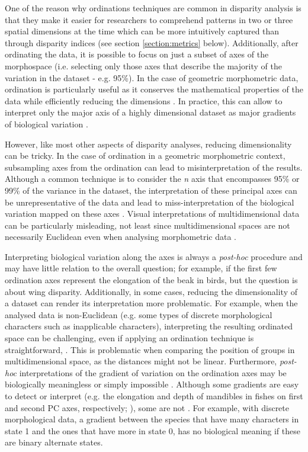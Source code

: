 \documentclass[12pt,letterpaper]{article}
\begin{document}
One of the reason why ordinations techniques are common in disparity analysis is that they make it easier for researchers to comprehend patterns in two or three spatial dimensions at the time which can be more intuitively captured than through disparity indices (see section \ref{section:metrics} below).
Additionally, after ordinating the data, it is possible to focus on just a subset of axes of the morphospace (i.e. selecting only those axes that describe the majority of the variation in the dataset - e.g. 95\%).
In the case of geometric morphometric data, ordination is particularly useful as it conserves the mathematical properties of the data while efficiently reducing the dimensions \citep{Legendre2012-va,dryden2016statistical}.
In practice, this can allow to interpret only the major axis of a highly dimensional dataset as major gradients of biological variation \citep[e.g. the elongation and flattening of birds beaks;][]{Cooney2017-ly}.

However, like most other aspects of disparity analyses, reducing dimensionality can be tricky.
In the case of ordination in a geometric morphometric context, subsampling axes from the ordination can lead to misinterpretation of the results. 
Although a common technique is to consider the \textit{n} axis that encompasses 95\% or 99\% of the variance in the dataset, the interpretation of these principal axes can be unrepresentative of the data and lead to miss-interpretation of the biological variation mapped on these axes \citep{Bookstein2015-yy, Bookstein2017-qk, Bookstein2017-gu,Weisbecker2019-kp}.
Visual interpretations of multidimensional data can be particularly misleading, not least since multidimensional spaces are not necessarily Euclidean even when analysing morphometric data \citep{Deline2018-le, Gerber2017-xi}.

Interpreting biological variation along the axes is always a \textit{post-hoc} procedure and may have little relation to the overall question; for example, if the first few ordination axes represent the elongation of the beak in birds, but the question is about wing disparity.
Additionally, in some cases, reducing the dimensionality of a dataset can render its interpretation more problematic.
For example, when the analysed data is non-Euclidean (e.g. some types of discrete morphological characters such as inapplicable characters), interpreting the resulting ordinated space can be challenging, even if applying an ordination technique is straightforward, \citep{Gerber2019}.
This is problematic when comparing the position of groups in multidimensional space, as the distances might not be linear.
Furthermore, \textit{post-hoc} interpretations of the gradient of variation on the ordination axes may be biologically meaningless or simply impossible \citep{Gerber2019}.
Although some gradients are easy to detect or interpret (e.g. the elongation and depth of mandibles in fishes on first and second PC axes, respectively; \citealt{Hill2018-ye}), some are not \citep[e.g.][]{Weisbecker2019-kp}.
For example, with discrete morphological data, a gradient between the species that have many characters in state 1 and the ones that have more in state 0, has no biological meaning if these are binary alternate states.
\end{document}
